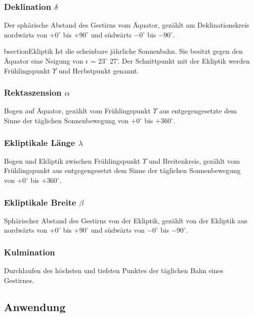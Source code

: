 \begin{refsection}
\subsubsection{Deklination $\delta$}
Der sphärische Abstand des Gestirns vom Äquator, gezählt am Deklinationskreis nordwärts von $+0^{\circ}$ bis $+90^{\circ}$ und südwärts $-0^{\circ}$ bis $-90^{\circ}$.

\subsu









bsection{Ekliptik}
Ist die scheinbare jährliche Sonnenbahn. Sie besitzt gegen den Äquator eine Neigung von $\epsilon$ = $23^{\circ}$ 27'. Der Schnittpunkt mit der Ekliptik werden Frühlingspunkt $\Upsilon$ und Herbstpunkt genannt. 


\subsubsection{Rektaszension $\alpha$}
Bogen auf Äquator, gezählt vom Frühlingspunkt $\Upsilon$ aus entgegengesetzte dem Sinne der täglichen Sonnenbewegung von $+0^{\circ}$ bis $+360^{\circ}$.

\subsubsection{Ekliptikale Länge $\lambda$}
Bogen und Ekliptik zwischen Frühlingspunkt $\Upsilon$ und Breitenkreis, gezählt vom Frühlingspunkt aus entgegengesetzt dem Sinne der täglichen Sonnenbewegung von $+0^{\circ}$ bis $+360^{\circ}$.

\subsubsection{Ekliptikale Breite $\beta$}
Sphärischer Abstand des Gestirns von der Ekliptik, gezählt von der Ekliptik aus nordwärts von $+0^{\circ}$ bis $+90^{\circ}$ und südwärts von $-0^{\circ}$ bis $-90^{\circ}$.

\subsubsection{Kulmination}
Durchlaufen des höchsten und tiefsten Punktes der täglichen Bahn eines Gestirnes.


\subsection{Anwendung}






\end{refsection}
